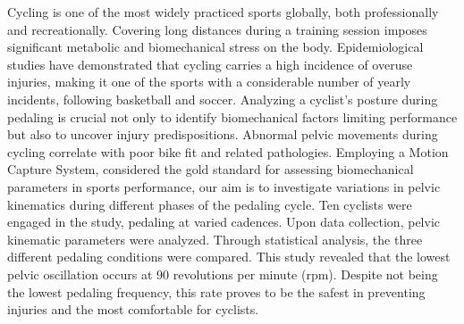 Cycling is one of the most widely practiced sports globally, both professionally and recreationally.
Covering long distances during a training session imposes significant metabolic and biomechanical stress on the body.
Epidemiological studies have demonstrated that cycling carries a high incidence of overuse injuries, making it one of the sports with a considerable number of yearly incidents, following basketball and soccer.
Analyzing a cyclist's posture during pedaling is crucial not only to identify biomechanical factors limiting performance but also to uncover injury predispositions.
Abnormal pelvic movements during cycling correlate with poor bike fit and related pathologies.
Employing a Motion Capture System, considered the gold standard for assessing biomechanical parameters in sports performance, our aim is to investigate variations in pelvic kinematics during different phases of the pedaling cycle.
Ten cyclists were engaged in the study, pedaling at varied cadences.
Upon data collection, pelvic kinematic parameters were analyzed.
Through statistical analysis, the three different pedaling conditions were compared.
This study \cite{ciclismo} revealed that the lowest pelvic oscillation occurs at 90 revolutions per minute (rpm).
Despite not being the lowest pedaling frequency, this rate proves to be the safest in preventing injuries and the most comfortable for cyclists.


